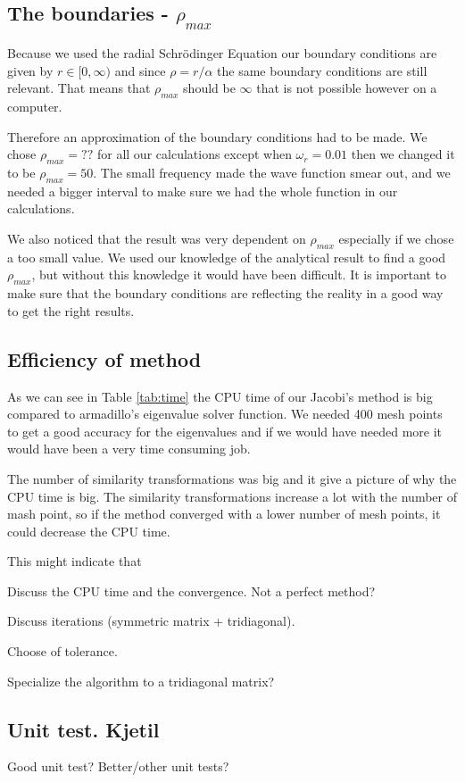 \subsection{The boundaries - $\rho_{max}$}

Because we used the radial Schrödinger Equation our boundary conditions are given by $r\in[0,\infty)$ and since $\rho = r/\alpha$ the same boundary conditions are still relevant. That means that $\rho_{max}$ should be $\infty$ that is not possible however on a computer.

Therefore an approximation of the boundary conditions had to be made. We chose $\rho_{max} = ?? $ for all our calculations except when $\omega_r = 0.01$ then we changed it to be $\rho_{max} = 50$. The small frequency made the wave function smear out, and we needed a bigger interval to make sure we had the whole function in our calculations. 

We also noticed that the result was very dependent on $\rho_{max}$ especially if we chose a too small value. We used our knowledge of the analytical result to find a good $\rho_{max}$, but without this knowledge it would have been difficult. It is important to make sure that the boundary conditions are reflecting the reality in a good way to get the right results. 

\subsection{Efficiency of method}

As we can see in Table \ref{tab:time} the CPU time of our Jacobi's method is big compared to armadillo's eigenvalue solver function. We needed 400 mesh points to get a good accuracy for the eigenvalues and if we would have needed more it would have been a very time consuming job.

The number of similarity transformations was big and it give a picture of why the CPU time is big. The similarity transformations increase a lot with the number of mash point, so if the method converged with a lower number of mesh points, it could decrease the CPU time.  

This might indicate that 

Discuss the CPU time and the convergence. Not a perfect method?

Discuss iterations (symmetric matrix + tridiagonal).

Choose of tolerance.

Specialize the algorithm to a tridiagonal matrix?

\subsection{Unit test. Kjetil}

Good unit test? Better/other unit tests?

